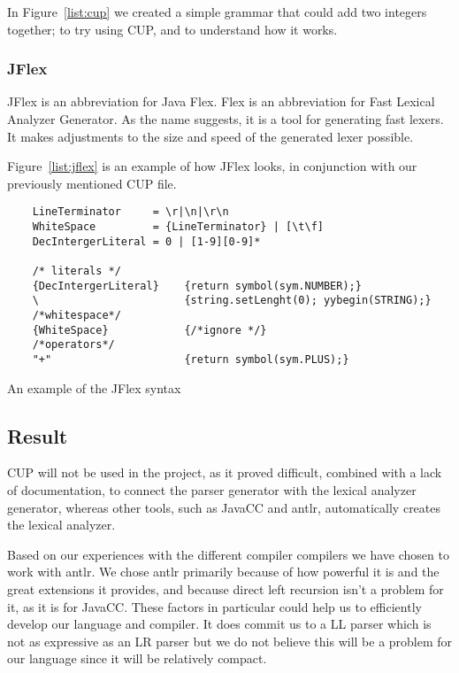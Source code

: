 In Figure~\ref{list:cup} we created a simple grammar that could add two integers together; to try using CUP, and to understand how it works.


\subsubsection{JFlex}
JFlex is an abbreviation for Java Flex. Flex is an abbreviation for Fast Lexical Analyzer Generator. As the name suggests, it is a tool for generating fast lexers. It makes adjustments to the size and speed of the generated lexer possible.

Figure~\ref{list:jflex} is an example of how JFlex looks, in conjunction with our previously mentioned CUP file.


\begin{listing}[htb!]
  \centering
  \begin{verbatim}
    LineTerminator     = \r|\n|\r\n
    WhiteSpace         = {LineTerminator} | [\t\f]
    DecIntergerLiteral = 0 | [1-9][0-9]*

    /* literals */
    {DecIntergerLiteral}    {return symbol(sym.NUMBER);}
    \                       {string.setLenght(0); yybegin(STRING);}
    /*whitespace*/ 
    {WhiteSpace}            {/*ignore */}  
    /*operators*/
    "+"                     {return symbol(sym.PLUS);}
  \end{verbatim}
  \caption{An example of the JFlex syntax}
  \label{list:jflex}
\end{listing}


\subsection{Result}
CUP will not be used in the project, as it proved difficult, combined with a lack of documentation, to connect the parser generator with the lexical analyzer generator, whereas other tools, such as JavaCC and \gls{antlr}, automatically creates the lexical analyzer.

Based on our experiences with the different compiler compilers we have chosen to work with \gls{antlr}. We chose \gls{antlr} primarily because of how powerful it is and the great extensions it provides, and because direct left recursion isn't a problem for it, as it is for JavaCC. These factors in particular could help us to efficiently develop our language and compiler. It does commit us to a LL parser which is not as expressive as an LR parser but we do not believe this will be a problem for our language since it will be relatively compact.
